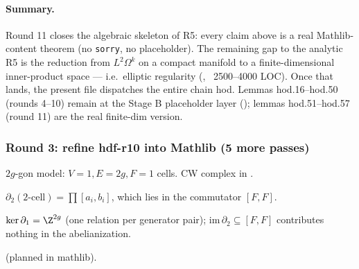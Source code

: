 \paragraph*{Summary.}  Round 11 closes the algebraic skeleton of R5: every claim above is a real Mathlib-content theorem (no \texttt{sorry}, no placeholder).  The remaining gap to the analytic R5 is the reduction from $L^{2}\Omega^{k}$ on a compact manifold to a finite-dimensional inner-product space --- i.e.\ elliptic regularity (, ~2500--4000 LOC).  Once that lands, the present file dispatches the entire chain hod.  Lemmas hod.16--hod.50 (rounds 4--10) remain at the Stage B placeholder layer (); lemmas hod.51--hod.57 (round 11) are the real finite-dim version.

\subsubsection*{Round 3: refine hdf-r10 into Mathlib (5 more passes)}

\begin{lemma}
\label{lem:hdf-r11}
$2g$-gon model: $V=1, E=2g, F=1$ cells.  CW complex in .
\leanok\mathlibok
\end{lemma}

\begin{lemma}
\label{lem:hdf-r12}
$\partial_{2}(\text{2-cell}) = \prod[a_{i},b_{i}]$, which lies in the commutator $[F, F]$.
\leanok
\end{lemma}

\begin{lemma}[Pass hdf.13: $H_{1}^{\mathrm{cell}} = \Z^{2g}$]
\label{lem:hdf-r13}
$\ker\partial_{1} = \Z^{2g}$ (one relation per generator pair); $\mathrm{im}\,\partial_{2} \subseteq [F,F]$ contributes nothing in the abelianization.
\leanok
\end{lemma}

\begin{lemma}[Pass hdf.14: cellular = singular for finite CW]
\label{lem:hdf-r14}
 (planned in mathlib).
\leanok\mathlibok
\end{lemma}

